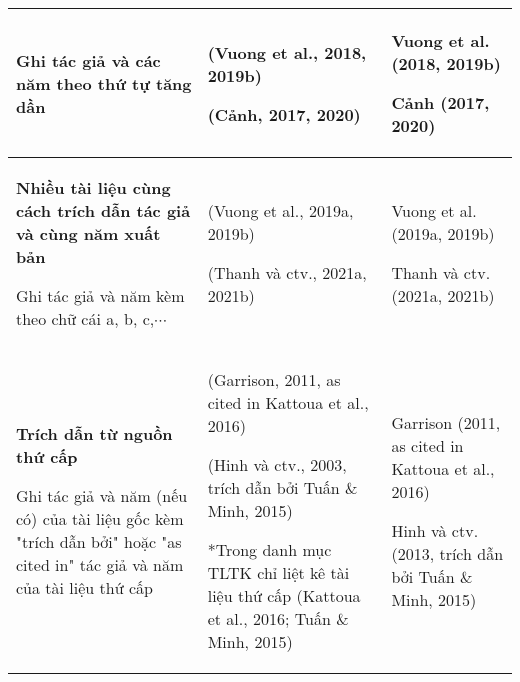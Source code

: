 \begin{table*}
\begin{tabular}{|l|l|l|}
Ghi tác giả và các năm theo thứ tự tăng dần
    & (Vuong et al., 2018, 2019b)

(Cảnh, 2017, 2020)
 & Vuong et al. (2018, 2019b)

Cảnh (2017, 2020)
 \\
         \hline
  \textbf{Nhiều tài liệu cùng cách trích dẫn tác giả và cùng năm xuất bản}
  
Ghi tác giả và năm kèm theo chữ cái a, b, c,$\cdots$ & (Vuong et al., 2019a, 2019b)

(Thanh và ctv., 2021a, 2021b)
 & Vuong et al. (2019a, 2019b)

Thanh và ctv. (2021a, 2021b)
\\
         \hline
      \textbf{Trích dẫn từ nguồn thứ cấp}
      
Ghi tác giả và năm (nếu có) của tài liệu gốc kèm "trích dẫn bởi" hoặc "as cited in" tác giả và năm của tài liệu thứ cấp
   & (Garrison, 2011, as cited in Kattoua et al., 2016)

(Hinh và ctv., 2003, trích dẫn bởi Tuấn $\&$ Minh, 2015)

*Trong danh mục TLTK chỉ liệt kê tài liệu thứ cấp (Kattoua et al., 2016; Tuấn $\&$ Minh, 2015)
 & Garrison (2011, as cited in Kattoua et al., 2016) 

Hinh và ctv. (2013, trích dẫn bởi Tuấn $\&$ Minh, 2015)
\\
        \hline
  \end{tabular}
\end{table*}

